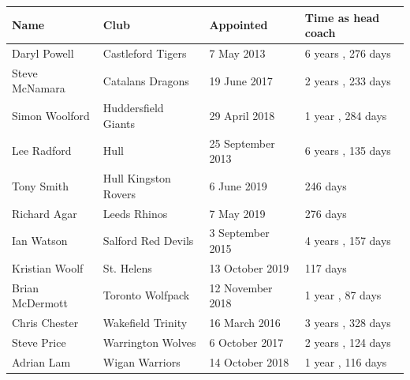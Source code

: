 \documentclass{article}
\begin{document}
\begin{tabular}{llll}
\toprule
Name & Club & Appointed & Time as head coach \\
\midrule
Daryl Powell & Castleford Tigers & 7 May 2013 & 6 years , 276 days \\
Steve McNamara & Catalans Dragons & 19 June 2017 & 2 years , 233 days \\
Simon Woolford & Huddersfield Giants & 29 April 2018 & 1 year , 284 days \\
Lee Radford & Hull & 25 September 2013 & 6 years , 135 days \\
Tony Smith & Hull Kingston Rovers & 6 June 2019 & 246 days \\
Richard Agar & Leeds Rhinos & 7 May 2019 & 276 days \\
Ian Watson & Salford Red Devils & 3 September 2015 & 4 years , 157 days \\
Kristian Woolf & St. Helens & 13 October 2019 & 117 days \\
Brian McDermott & Toronto Wolfpack & 12 November 2018 & 1 year , 87 days \\
Chris Chester & Wakefield Trinity & 16 March 2016 & 3 years , 328 days \\
Steve Price & Warrington Wolves & 6 October 2017 & 2 years , 124 days \\
Adrian Lam & Wigan Warriors & 14 October 2018 & 1 year , 116 days \\
\bottomrule
\end{tabular}
\end{document}

